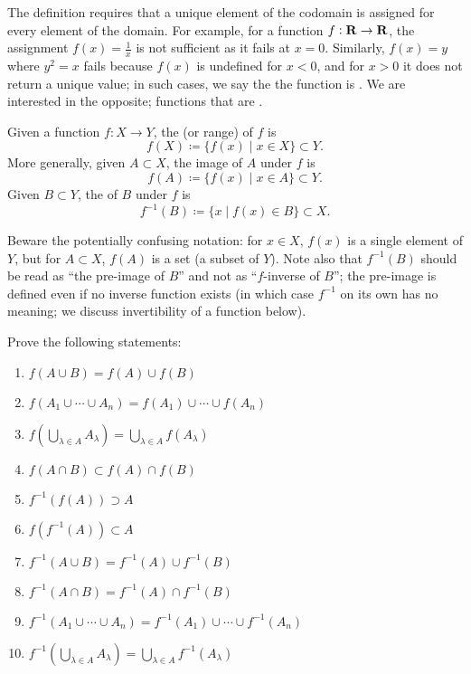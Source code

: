 \begin{remark}
The definition requires that a unique element of the codomain is assigned for every element of the domain. For example, for a function $f:\mathbf R \to \mathbf R$, the assignment $f(x)=\frac{1}{x}$ is not sufficient as it fails at $x=0$. Similarly, $f(x)=y$ where $y^2=x$ fails because $f(x)$ is undefined for $x<0$, and for $x>0$ it does not return a unique value; in such cases, we say the the function is . We are interested in the opposite; functions that are .
\end{remark}

\begin{definition}
Given a function $f:X \to Y$, the  (or range) of $f$ is
\[f(X)\coloneqq\{f(x)\mid x\in X\}\subset Y.\]
More generally, given $A \subset X$, the image of $A$ under $f$ is
\[f(A)\coloneqq\{f(x)\mid x\in A\}\subset Y.\]
Given $B \subset Y$, the  of $B$ under $f$ is
\[f^{-1}(B)\coloneqq\{x\mid f(x)\in B\}\subset X.\]
\end{definition}

\begin{remark}
Beware the potentially confusing notation: for $x \in X$, $f(x)$ is a single element of $Y$, but for $A \subset X$, $f(A)$ is a set (a subset of $Y$). Note also that $f^{-1}(B)$ should be read as ``the pre-image of $B$'' and not as ``$f$-inverse of $B$''; the pre-image is defined even if no inverse function exists (in which case $f^{-1}$ on its own has no meaning; we discuss invertibility of a function below).
\end{remark}

\begin{exercise}
Prove the following statements:
\begin{enumerate}[label=(\alph*)]
\item $f(A\cup B)=f(A)\cup f(B)$
\item $f(A_1\cup\cdots\cup A_n)=f(A_1)\cup\cdots\cup f(A_n)$
\item $f(\bigcup_{\lambda\in A}A_\lambda)=\bigcup_{\lambda\in A}f(A_\lambda)$
\item $f(A\cap B)\subset f(A)\cap f(B)$
\item $f^{-1}(f(A))\supset A$
\item $f(f^{-1}(A))\subset A$
\item $f^{-1}(A\cup B)=f^{-1}(A)\cup f^{-1}(B)$
\item $f^{-1}(A\cap B)=f^{-1}(A)\cap f^{-1}(B)$
\item $f^{-1}(A_1\cup\cdots\cup A_n)=f^{-1}(A_1)\cup\cdots\cup f^{-1}(A_n)$
\item $f^{-1}(\bigcup_{\lambda\in A}A_\lambda)=\bigcup_{\lambda\in A}f^{-1}(A_\lambda)$
\end{enumerate}
\end{exercise}


